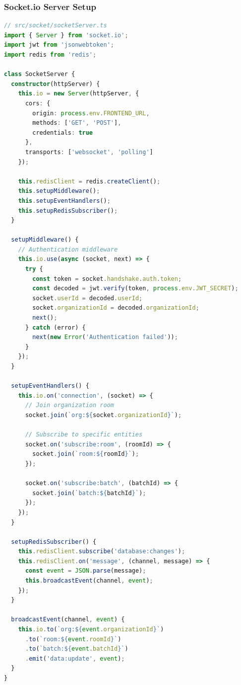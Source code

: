 \documentclass[11pt,a4paper]{article}
\begin{document}
\subsubsection{Socket.io Server Setup}
\begin{lstlisting}[language=TypeScript, caption=Socket.io Server Configuration]
// src/socket/socketServer.ts
import { Server } from 'socket.io';
import jwt from 'jsonwebtoken';
import redis from 'redis';

class SocketServer {
  constructor(httpServer) {
    this.io = new Server(httpServer, {
      cors: {
        origin: process.env.FRONTEND_URL,
        methods: ['GET', 'POST'],
        credentials: true
      },
      transports: ['websocket', 'polling']
    });
    
    this.redisClient = redis.createClient();
    this.setupMiddleware();
    this.setupEventHandlers();
    this.setupRedisSubscriber();
  }

  setupMiddleware() {
    // Authentication middleware
    this.io.use(async (socket, next) => {
      try {
        const token = socket.handshake.auth.token;
        const decoded = jwt.verify(token, process.env.JWT_SECRET);
        socket.userId = decoded.userId;
        socket.organizationId = decoded.organizationId;
        next();
      } catch (error) {
        next(new Error('Authentication failed'));
      }
    });
  }

  setupEventHandlers() {
    this.io.on('connection', (socket) => {
      // Join organization room
      socket.join(`org:${socket.organizationId}`);
      
      // Subscribe to specific entities
      socket.on('subscribe:room', (roomId) => {
        socket.join(`room:${roomId}`);
      });
      
      socket.on('subscribe:batch', (batchId) => {
        socket.join(`batch:${batchId}`);
      });
    });
  }

  setupRedisSubscriber() {
    this.redisClient.subscribe('database:changes');
    this.redisClient.on('message', (channel, message) => {
      const event = JSON.parse(message);
      this.broadcastEvent(channel, event);
    });
  }

  broadcastEvent(channel, event) {
    this.io.to(`org:${event.organizationId}`)
      .to(`room:${event.roomId}`)
      .to(`batch:${event.batchId}`)
      .emit('data:update', event);
  }
}
\end{lstlisting}
\end{document}
